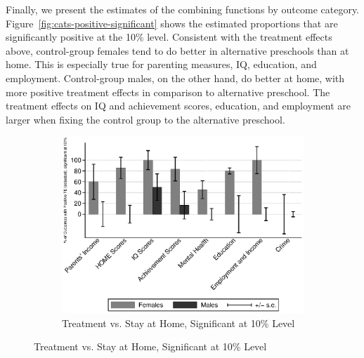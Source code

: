 Finally, we present the estimates of the combining functions by outcome category. Figure~\ref{fig:cats-positive-significant} shows the estimated proportions that are significantly positive at the 10\% level. Consistent with the treatment effects above, control-group females tend to do better in alternative preschools than at home. This is especially true for parenting measures, IQ, education, and employment. Control-group males, on the other hand, do better at home, with more positive treatment effects in comparison to alternative preschool. The treatment effects on IQ and achievement scores, education, and employment are larger when fixing the control group to the alternative preschool.

\begin{figure}[!htbp]
\centering
\caption{Positively Impacted Outcomes by Category, ABC/CARE Males and Females}\label{fig:cats-positive-significant}
\begin{subfigure}[h]{0.7\textwidth}
	\centering
	\caption{Treatment vs. Stay at Home, Significant at 10\% Level} 
		\includegraphics[width=\textwidth]{output/epan_ipw_p0_cats1_sig10.eps}
\end{subfigure}


\end{figure}
